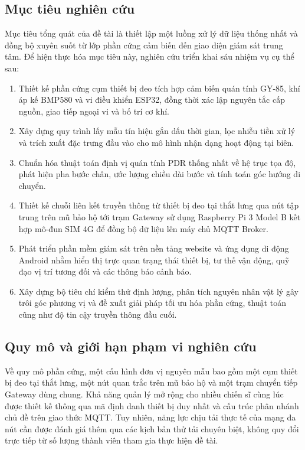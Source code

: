 \subsection{Mục tiêu nghiên cứu}
Mục tiêu tổng quát của đề tài là thiết lập một luồng xử lý dữ liệu thống nhất và đồng bộ xuyên suốt từ lớp phần cứng cảm biến đến giao diện giám sát trung tâm. Để hiện thực hóa mục tiêu này, nghiên cứu triển khai sáu nhiệm vụ cụ thể sau:
\begin{enumerate}
\item Thiết kế phần cứng cụm thiết bị đeo tích hợp cảm biến quán tính GY-85, khí áp kế BMP580 và vi điều khiển ESP32, đồng thời xác lập nguyên tắc cấp nguồn, giao tiếp ngoại vi và bố trí cơ khí.
\item Xây dựng quy trình lấy mẫu tín hiệu gắn dấu thời gian, lọc nhiễu tiền xử lý và trích xuất đặc trưng đầu vào cho mô hình nhận dạng hoạt động tại biên.
\item Chuẩn hóa thuật toán định vị quán tính PDR thống nhất về hệ trục tọa độ, phát hiện pha bước chân, ước lượng chiều dài bước và tính toán góc hướng di chuyển.
\item Thiết kế chuỗi liên kết truyền thông từ thiết bị đeo tại thắt lưng qua nút tập trung trên mũ bảo hộ tới trạm Gateway sử dụng Raspberry Pi 3 Model B kết hợp mô-đun SIM 4G để đồng bộ dữ liệu lên máy chủ MQTT Broker.
\item Phát triển phần mềm giám sát trên nền tảng website và ứng dụng di động Android nhằm hiển thị trực quan trạng thái thiết bị, tư thế vận động, quỹ đạo vị trí tương đối và các thông báo cảnh báo.
\item Xây dựng bộ tiêu chí kiểm thử định lượng, phân tích nguyên nhân vật lý gây trôi góc phương vị và đề xuất giải pháp tối ưu hóa phần cứng, thuật toán cũng như độ tin cậy truyền thông đầu cuối.
\end{enumerate}

\subsection{Quy mô và giới hạn phạm vi nghiên cứu}
Về quy mô phần cứng, một cấu hình đơn vị nguyên mẫu bao gồm một cụm thiết bị đeo tại thắt lưng, một nút quan trắc trên mũ bảo hộ và một trạm chuyển tiếp Gateway dùng chung. Khả năng quản lý mở rộng cho nhiều chiến sĩ cùng lúc được thiết kế thông qua mã định danh thiết bị duy nhất và cấu trúc phân nhánh chủ đề trên giao thức MQTT. Tuy nhiên, năng lực chịu tải thực tế của mạng đa nút cần được đánh giá thêm qua các kịch bản thử tải chuyên biệt, không quy đổi trực tiếp từ số lượng thành viên tham gia thực hiện đề tài.

